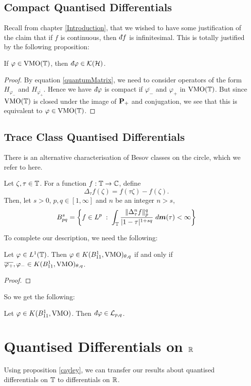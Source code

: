 \subsection{Compact Quantised Differentials}
Recall from chapter \ref{Introduction}, that we wished to have some justification
of the claim that if $f$ is continuous, then $\qd f$ is infinitesimal. This is totally
justified by the following proposition:
\begin{proposition}
    If $\varphi \in \operatorname{VMO}(\mathbb{T})$, then $\qd \varphi \in \mathcal{K}(\Hilb)$.
\end{proposition}
\begin{proof}
    By equation \ref{quantumMatrix}, we need to consider operators of the form $H_{\varphi_-}$
    and $H_{\overline{\varphi_+}}$. Hence we have $\qd \varphi$ is compact
    if $\overline{\varphi_-}$ and $\varphi_+$ in $\operatorname{VMO}(\mathbb{T})$. But 
    since $\operatorname{VMO}(\mathbb{T})$ is closed under the image of $\mathbf{P}_+$ and conjugation,
    we see that this is equivalent to $\varphi \in \operatorname{VMO}(\mathbb{T})$. 
\end{proof}


\subsection{Trace Class Quantised Differentials}
There is an alternative characterisation of Besov
classes on the circle, which we refer to here. 
\begin{proposition}
    Let $\zeta,\tau \in \mathbb{T}$. For a function
    $f:\mathbb{T}\to\mathbb{C}$, define
    \begin{equation}
        \Delta_\tau f(\zeta) = f(\tau\zeta)-f(\zeta).
    \end{equation}
    Then, let $s > 0$, $p,q \in [1,\infty]$ and $n$ be an integer $n > s$,
    \begin{equation}
        B_{pq}^s = \left\{f \in L^p\;:\;\int_{\mathbb{T}} \frac{\|\Delta^n_\tau f\|_p^q}{|1-\tau|^{1+sq}}\;d\boldsymbol{m}(\tau) < \infty\right\}
    \end{equation}
\end{proposition}

To complete our description, we need the following:
\begin{lemma}
    Let $\varphi \in L^1(\mathbb{T})$. Then $\varphi \in K(B_{11}^1,\operatorname{VMO})_{\theta,q}$ if and only
    if $\overline{\varphi_+},\varphi_- \in K(B_{11}^1,\operatorname{VMO})_{\theta,q}$.
\end{lemma}
\begin{proof}
    
\end{proof}
    
So we get the following:
\begin{corollary}
    Let $\varphi\in K(B_{11}^1,\operatorname{VMO})$. Then $\qd \varphi \in \mathcal{L}_{p,q}$. 
\end{corollary}

\section{Quantised Differentials on $\mathbb{R}$}
Using proposition \ref{cayley}, we can transfer our results
about quantised differentials on $\mathbb{T}$ to differentials on $\mathbb{R}$.

